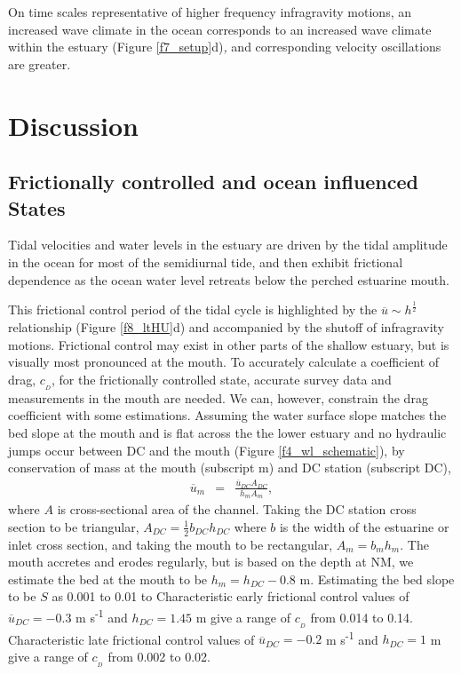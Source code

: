 On time scales representative of higher frequency infragravity motions,
an increased wave climate in the ocean corresponds to an increased
wave climate within the estuary (Figure \ref{f7_setup}d)\emph{, }and corresponding velocity oscillations are greater.





\section{Discussion}


\subsection{Frictionally controlled and ocean influenced States\label{sub:disc_FC_tides}}

Tidal velocities and water levels in the estuary are driven by the
tidal amplitude in the ocean for most of the semidiurnal tide, and
then exhibit frictional dependence as the ocean water level retreats
below the perched estuarine mouth. 

This frictional control period of the tidal cycle is highlighted by
the $\overline{u}\sim h^{\frac{1}{2}}$ relationship (Figure \ref{f8_ltHU}d)
and accompanied by the shutoff of infragravity motions. Frictional
control may exist in other parts of the shallow estuary, but is visually
most pronounced at the mouth. To accurately calculate a coefficient
of drag, $c_{_D}$, for the frictionally controlled state, accurate
survey data and measurements in the mouth are needed. We can, however,
constrain the drag coefficient with some estimations. Assuming the
water surface slope matches the bed slope at the mouth and is flat
across the the lower estuary and no hydraulic jumps occur between
DC and the mouth (Figure \ref{f4_wl_schematic}), by conservation
of mass at the mouth (subscript m) and DC station (subscript DC),
\begin{eqnarray}
\overline{u}_{m} & = & \frac{\overline{u}_{DC}A_{DC}}{h_{m}A_{m}},\label{eq:consmass_udc_um}
\end{eqnarray}
where $A\mbox{}$ is cross-sectional area of the channel. Taking the
DC station cross section to be triangular, $A_{DC}=\frac{1}{2}b_{DC}h_{DC}$
where \textbf{$b\mbox{}$} is the width of the estuarine or inlet
cross section, and taking the mouth to be rectangular, $A_{m}=b_{m}h_{m}$.\emph{
}The mouth accretes and erodes regularly, but is based on the depth
at NM, we estimate the bed at the mouth to be $h_{m}=h_{DC}-0.8$
m. Estimating the bed slope to be $S$ as 0.001 to 0.01 to Characteristic
early frictional control values of $\overline{{u}}{}_{DC}=-0.3$ m
s\textsuperscript{-1} and $h_{DC}=1.45$ m give a range of $c_{_D}$
from 0.014 to 0.14. Characteristic late frictional control values
of $\overline{{u}}{}_{DC}=-0.2$ m s\textsuperscript{-1} and $h_{DC}=1$
m give a range of $c_{_D}$ from 0.002 to 0.02.

